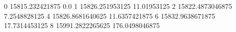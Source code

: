 0 15815.232421875 0.0
1 15826.251953125 11.01953125
2 15822.4873046875 7.2548828125
4 15826.8681640625 11.6357421875
6 15832.9638671875 17.7314453125
8 15991.2822265625 176.0498046875
